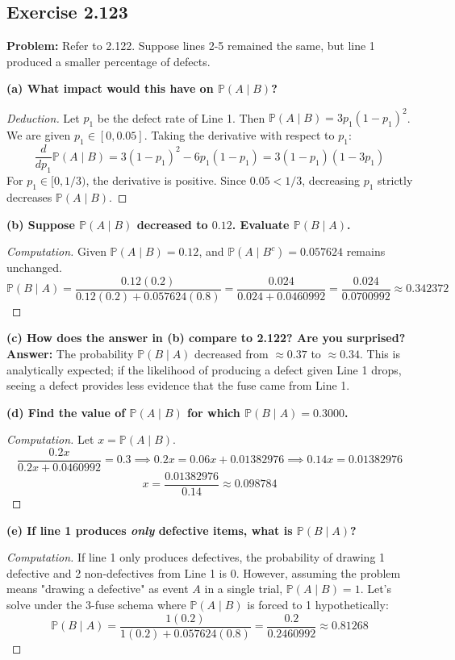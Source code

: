 \documentclass[12pt]{article}
\theoremstyle{definition}
\theoremstyle{remark}
\newcommand{\Pbb}{\mathbb{P}}
\begin{document}
\subsection*{Exercise 2.123}
\textbf{Problem:} Refer to 2.122. Suppose lines 2-5 remained the same, but line 1 produced a smaller percentage of defects.

\textbf{(a) What impact would this have on $\Pbb(A \mid B)$?}
\begin{proof}[Deduction]
Let $p_1$ be the defect rate of Line 1. Then $\Pbb(A \mid B) = 3p_1(1-p_1)^2$. We are given $p_1 \in [0, 0.05]$. 
Taking the derivative with respect to $p_1$:
\[ \frac{d}{dp_1} \Pbb(A \mid B) = 3(1-p_1)^2 - 6p_1(1-p_1) = 3(1-p_1)(1 - 3p_1) \]
For $p_1 \in [0, 1/3)$, the derivative is positive. Since $0.05 < 1/3$, decreasing $p_1$ strictly decreases $\Pbb(A \mid B)$. 
\end{proof}

\textbf{(b) Suppose $\Pbb(A \mid B)$ decreased to $0.12$. Evaluate $\Pbb(B \mid A)$.}
\begin{proof}[Computation]
Given $\Pbb(A \mid B) = 0.12$, and $\Pbb(A \mid B^c) = 0.057624$ remains unchanged.
\[ \Pbb(B \mid A) = \frac{0.12(0.2)}{0.12(0.2) + 0.057624(0.8)} = \frac{0.024}{0.024 + 0.0460992} = \frac{0.024}{0.0700992} \approx 0.342372 \]
\end{proof}

\textbf{(c) How does the answer in (b) compare to 2.122? Are you surprised?}
\textbf{Answer:} The probability $\Pbb(B \mid A)$ decreased from $\approx 0.37$ to $\approx 0.34$. This is analytically expected; if the likelihood of producing a defect given Line 1 drops, seeing a defect provides less evidence that the fuse came from Line 1.

\textbf{(d) Find the value of $\Pbb(A \mid B)$ for which $\Pbb(B \mid A) = 0.3000$.}
\begin{proof}[Computation]
Let $x = \Pbb(A \mid B)$.
\[ \frac{0.2x}{0.2x + 0.0460992} = 0.3 \implies 0.2x = 0.06x + 0.01382976 \implies 0.14x = 0.01382976 \]
\[ x = \frac{0.01382976}{0.14} \approx 0.098784 \]
\end{proof}

\textbf{(e) If line 1 produces \textit{only} defective items, what is $\Pbb(B \mid A)$?}
\begin{proof}[Computation]
If line 1 only produces defectives, the probability of drawing 1 defective and 2 non-defectives from Line 1 is 0. However, assuming the problem means "drawing a defective" as event $A$ in a single trial, $\Pbb(A \mid B) = 1$. Let's solve under the 3-fuse schema where $\Pbb(A \mid B)$ is forced to 1 hypothetically:
\[ \Pbb(B \mid A) = \frac{1(0.2)}{1(0.2) + 0.057624(0.8)} = \frac{0.2}{0.2460992} \approx 0.81268 \]
\end{proof}
\end{document}
